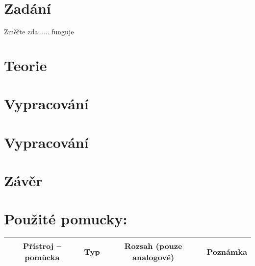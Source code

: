 \documentclass[a4paper]{article}
\begin{document}



\section*{Zadání}
Změřte zda...... funguje
\section*{Teorie}
\section*{Vypracování}


\section*{Vypracování}

\section*{Závěr}
\section*{Použité pomucky:}
\begin{tabularx}{\linewidth}{c|c|c|c}
	Přístroj – pomůcka & Typ & Rozsah (pouze analogové)
	& Poznámka \\
	\hline
\end{tabularx}
\end{document}
